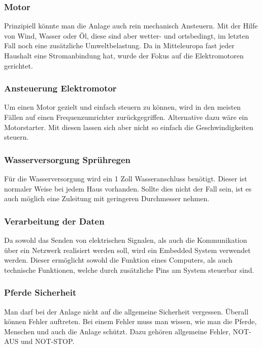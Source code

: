 \documentclass[12pt]{scrartcl}
\begin{document}
\subsubsection{Motor}
\label{sec:motor}

Prinzipiell könnte man die Anlage auch rein mechanisch Ansteuern. Mit der Hilfe von Wind, Wasser oder Öl, diese sind aber wetter- und ortsbedingt, im letzten Fall noch eine zusätzliche Umweltbelastung. Da in Mitteleuropa fast jeder Haushalt eine Stromanbindung hat, wurde der Fokus auf die Elektromotoren gerichtet.

\subsubsection{Ansteuerung Elektromotor}
\label{sec:ansteuerungElektromotor}

Um einen Motor gezielt und einfach steuern zu können, wird in den meisten Fällen auf einen Frequenzumrichter zurückgegriffen. Alternative dazu wäre ein Motorstarter. Mit diesen lassen sich aber nicht so einfach die Geschwindigkeiten steuern.

\subsubsection{Wasserversorgung Sprühregen}
\label{sec:wasserversorgungSpruehregen}

Für die Wasserversorgung wird ein 1 Zoll Wasseranschluss benötigt. Dieser ist normaler Weise bei jedem Haus vorhanden. 
Sollte dies nicht der Fall sein, ist es auch möglich eine Zuleitung mit geringeren Durchmesser nehmen.

\subsubsection{Verarbeitung der Daten}
\label{sec:verarbeitungDerDaten}

Da sowohl das Senden von elektrischen Signalen, als auch die Kommunikation über ein Netzwerk realisiert werden soll, wird ein Embedded System verwendet werden.
Dieser ermöglicht sowohl die Funktion eines Computers, als auch technische Funktionen, welche durch zusätzliche Pins am System steuerbar sind.

\subsubsection{Pferde Sicherheit}
\label{sec:pferdeSicherheit}

Man darf bei der Anlage nicht auf die allgemeine Sicherheit vergessen. Überall können Fehler auftreten. Bei einem Fehler muss man wissen, wie man die Pferde, Menschen und auch die Anlage schützt. Dazu gehören allgemeine Fehler, NOT-AUS und NOT-STOP.
\newpage
\end{document}
